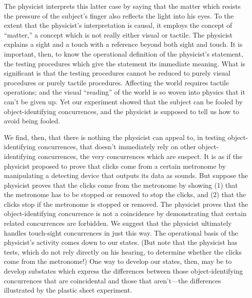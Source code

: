 The physicist interprets this latter case by saying that the matter which resists the pressure of the subject's finger also reflects the light into his eyes. To the extent that the physicist's interpretation is causal, it employs the concept of \enquote{matter,} a concept which is not really either visual or tactile. The physicist explains a sight and a touch with a reference beyond both sight and touch. It is important, then, to know the operational definition of the physicist's statement, the testing procedures which give the statement its immediate meaning. What is significant is that the testing procedures cannot be reduced to purely visual procedures or purely tactile procedures. Affecting the world requires tactile operations; and the visual \enquote{reading} of the world is so woven into physics that it can't be given up. Yet our experiment showed that the subject can be fooled by object-identifying concurrences, and the physicist is supposed to tell us how to avoid being fooled. 

We find, then, that there is nothing the physicist can appeal to, in testing object-identifying concurrences, that doesn't immediately rely on other object-identifying concurrences, the very concurrences which are suspect. It is as if the physicist proposed to prove that clicks come from a certain metronome by manipulating a detecting device that outputs its data as sounds. But suppose the physicist proves that the clicks come from the metronome by showing (1) that the metronome has to be stopped or removed to stop the clicks, and (2) that the clicks stop if the metronome is stopped or removed. The physicist proves that the object-identifying concurrence is not a coincidence by demonstrating that certain related concurrences are forbidden. We suggest that the physicist ultimately handles touch-sight concurrences in just this way. The operational basis of the physicist's activity comes down to our states. (But note that the physicist has tests, which do not rely directly on his hearing, to determine whether the clicks come from the metronome!) One way to develop our states, then, may be to develop substates which express the differences between those object-identifying concurrences that are coincidental and those that aren't---the differences illustrated by the plastic sheet experiment. 

